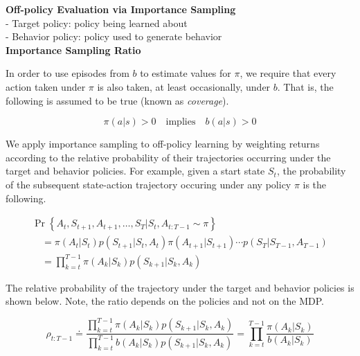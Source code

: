 \documentclass{article}
\begin{document}
\noindent
\textbf{Off-policy Evaluation via Importance Sampling}\\
- Target policy: policy being learned about\\
- Behavior policy: policy used to generate behavior\\

\noindent
\textbf{Importance Sampling Ratio}

\noindent
In order to use episodes from $b$ to estimate values for $\pi$, we require that
every action taken under $\pi$ is also taken, at least occasionally, under $b$.
That is, the following is assumed to be true (known as \textit{coverage}).

\begin{equation}
\pi(a | s) > 0 \quad \text{implies} \quad b(a|s) > 0
\end{equation}

\noindent
We apply importance sampling to off-policy learning by weighting returns
according to the relative probability of their trajectories occurring under the
target and behavior policies. For example, given a start state $S_{t}$, the
probability of the subsequent state-action trajectory occuring under any policy
$\pi$ is the following.

\begin{equation}
\begin{array}{l}
\operatorname{Pr}\left\{A_{t}, S_{t+1}, A_{t+1}, \ldots, S_{T} | S_{t}, A_{t: T-1} \sim \pi\right\} \\
\quad=\pi\left(A_{t} | S_{t}\right) p\left(S_{t+1} | S_{t}, A_{t}\right) \pi\left(A_{t+1} | S_{t+1}\right) \cdots p\left(S_{T} | S_{T-1}, A_{T-1}\right) \\
\quad=\prod_{k=t}^{T-1} \pi\left(A_{k} | S_{k}\right) p\left(S_{k+1} | S_{k}, A_{k}\right)
\end{array}
\end{equation}

\newpage
\noindent
The relative probability of the trajectory under the target and behavior
policies is shown below. Note, the ratio depends on the policies and not on the
MDP.

\begin{equation}
\rho_{t: T-1} \doteq \frac{\prod_{k=t}^{T-1} \pi\left(A_{k} | S_{k}\right) p\left(S_{k+1} | S_{k}, A_{k}\right)}{\prod_{k=t}^{T-1} b\left(A_{k} | S_{k}\right) p\left(S_{k+1} | S_{k}, A_{k}\right)}=\prod_{k=t}^{T-1} \frac{\pi\left(A_{k} | S_{k}\right)}{b\left(A_{k} | S_{k}\right)}
\end{equation}
\end{document}
